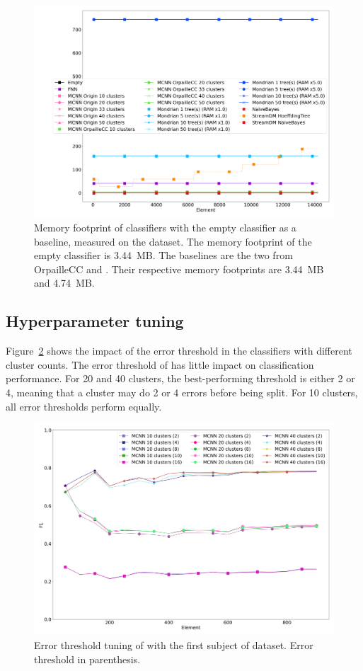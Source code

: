 \begin{figure}
	\includegraphics[width=\linewidth]{figures/results/banos_6_memory.png}
	\caption{Memory footprint of classifiers with the empty
	classifier as a baseline, measured on the \banosdataset dataset. The memory footprint of the empty
	classifier is 3.44~MB. The baselines are the two \naivebayes from OrpailleCC
		and \streamdmcpp. Their respective memory footprints are 3.44~MB and
		4.74~MB. }
	\label{fig:memory}
\end{figure}


\subsection{Hyperparameter tuning}

Figure~\ref{fig:mcnn-tuning-error} shows the impact of the error threshold
in the \mcnn classifiers with different cluster counts. The error
threshold of \mcnn has little impact on classification performance. For
20 and 40 clusters, the best-performing threshold is either 2 or 4, meaning
that a cluster may do 2 or 4 errors before being split. For 10 clusters,
all error thresholds perform equally.

\begin{figure}
  \includegraphics[width=\linewidth]{figures/calibration_mcnn.png}
	\caption{Error threshold tuning of \mcnn with the first subject of
		\banosdataset dataset. Error threshold in parenthesis.}
	\label{fig:mcnn-tuning-error}
\end{figure}

